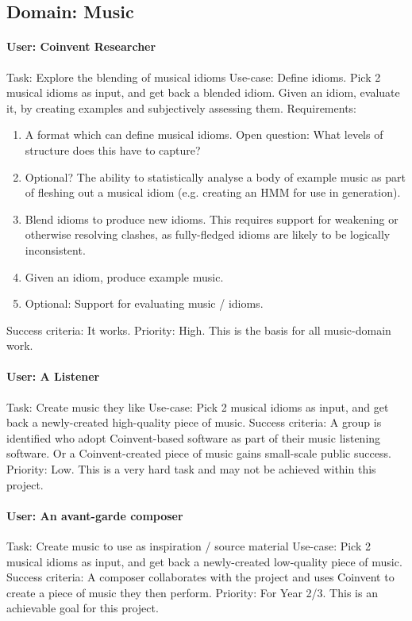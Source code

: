 \begin{appendices}
\subsection{Domain: Music}

\paragraph{User: Coinvent Researcher}
Task: Explore the blending of musical idioms      
Use-case: Define idioms. Pick 2 musical idioms as input, and get back a blended idiom. Given an idiom, evaluate it, by creating examples and subjectively assessing them.   
Requirements: 
\begin{enumerate}
\item A format which can define musical idioms. Open question: What levels of structure does this have to capture?
\item Optional? The ability to statistically analyse a body of example music as part of fleshing out a musical idiom (e.g. creating an HMM for use in generation).
\item Blend idioms to produce new idioms. This requires support for weakening or otherwise resolving clashes, as fully-fledged idioms are likely to be logically inconsistent.
\item Given an idiom, produce example music.
\item Optional: Support for evaluating music / idioms.
\end{enumerate}
Success criteria: It works.       
Priority: High. This is the basis for all music-domain work.
 
\paragraph{User: A Listener}
Task: Create music they like      
Use-case: Pick 2 musical idioms as input, and get back a newly-created high-quality piece of music.
Success criteria: A group is identified who adopt Coinvent-based software as part of their music listening software. Or a Coinvent-created piece of music gains small-scale public success.   
Priority: Low. This is a very hard task and may not be achieved within this project.
 
\paragraph{User: An avant-garde composer}
Task: Create music to use as inspiration / source material   
Use-case: Pick 2 musical idioms as input, and get back a newly-created low-quality piece of music.   
Success criteria: A composer collaborates with the project and uses Coinvent to create a piece of music they then perform.      
Priority: For Year 2/3. This is an achievable goal for this project.



\end{appendices}
